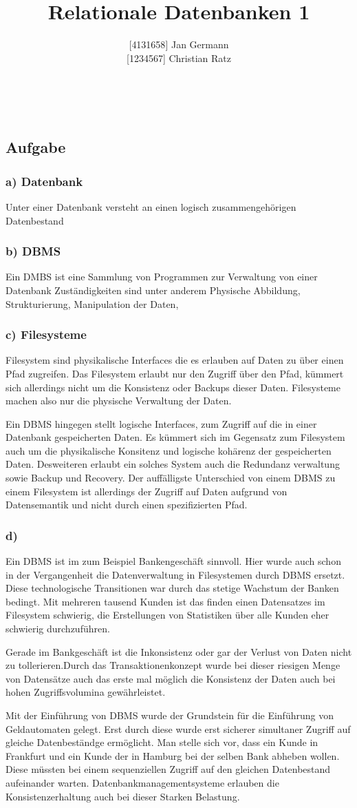 \documentclass[12pt,a4paper,DIV=9]{scrartcl}
\author{{[}4131658{]} Jan Germann \\{[}1234567{]} Christian Ratz}
\title{Relationale Datenbanken 1}
\newcounter{temp}
\newcommand{\aufgabe}[1]{
  \setcounter{temp}{\value{subsection}}
  \setcounter{subsection}{#1}
  \addtocounter{subsection}{-1}
  \subsection{Aufgabe}
  \setcounter{subsection}{\value{temp}}
}
\newcommand{\teil}[2][]{
  \subsubsection*{#2) #1}
}
\renewcommand{\author}[1]{\renewcommand{\author}{#1}}
\renewcommand{\title}[1]{\renewcommand{\title}{#1}}
\newcommand{\makehomeworktitle}{
  \begin{minipage}{6.5cm}
    \sf{\author}
  \end{minipage}
  \begin{minipage}{6.5cm}
    \begin{flushright}
      \sf{\title\\\today}
    \end{flushright}
  \end{minipage}
  \\[0.2cm]
  \begin{center}
    \sf{
      \color{blue}{
        \LARGE{Aufgabenblatt \blattnr}
      }
    }
  \end{center}
  \vspace{0.1cm}
}
\begin{document}
\makehomeworktitle

\aufgabe{2}
\teil[Datenbank]{a}
Unter einer Datenbank versteht an einen logisch zusammengehörigen Datenbestand

\teil[DBMS]{b}
  Ein DMBS ist eine Sammlung von Programmen zur Verwaltung von einer Datenbank
Zuständigkeiten sind unter anderem Physische Abbildung, Strukturierung, Manipulation der Daten,

\teil[Filesysteme]{c}
  Filesystem sind physikalische Interfaces die es erlauben auf Daten zu über einen Pfad zugreifen. Das Filesystem erlaubt nur den Zugriff über den Pfad, kümmert sich allerdings nicht um die Konsistenz oder Backups dieser Daten. Filesysteme machen also nur die physische Verwaltung der Daten.

  Ein DBMS hingegen stellt logische Interfaces, zum Zugriff auf die in einer Datenbank gespeicherten Daten. Es kümmert sich im Gegensatz zum Filesystem auch um die physikalische Konsitenz und logische kohärenz der gespeicherten Daten. Desweiteren erlaubt ein solches System auch die Redundanz verwaltung sowie Backup und Recovery. Der auffälligste Unterschied von einem DBMS zu einem Filesystem ist allerdings der Zugriff auf Daten aufgrund von Datensemantik und nicht durch einen spezifizierten Pfad.

\teil{d}
  Ein DBMS ist im zum Beispiel Bankengeschäft sinnvoll. Hier wurde auch schon in der Vergangenheit die Datenverwaltung in Filesystemen durch DBMS ersetzt. Diese technologische Transitionen war durch das stetige Wachstum der Banken bedingt. Mit mehreren tausend Kunden ist das finden einen Datensatzes im Filesystem schwierig, die Erstellungen von Statistiken über alle Kunden eher schwierig durchzuführen.

  Gerade im Bankgeschäft ist die Inkonsistenz oder gar der Verlust von Daten nicht zu tollerieren.Durch das Transaktionenkonzept wurde bei dieser riesigen Menge von Datensätze auch das erste mal möglich die Konsistenz der Daten auch bei hohen Zugriffsvolumina gewährleistet.

  Mit der Einführung von DBMS wurde der Grundstein für die Einführung von Geldautomaten gelegt. Erst durch diese wurde erst sicherer simultaner Zugriff auf gleiche Datenbeständge ermöglicht. Man stelle sich vor, dass ein Kunde in Frankfurt und ein Kunde der in Hamburg bei der selben Bank abheben wollen. Diese müssten bei einem sequenziellen Zugriff auf den gleichen Datenbestand aufeinander warten. Datenbankmanagementsysteme erlauben die Konsistenzerhaltung auch bei dieser Starken Belastung.
\end{document}
